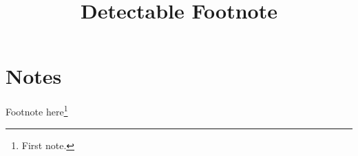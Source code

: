 \documentclass[letterpaper]{article}
\begin{document}
\title{Detectable Footnote}\author{}\date{}\maketitle
\section{Notes}
Footnote here\footnote{First note.}
\end{document}
